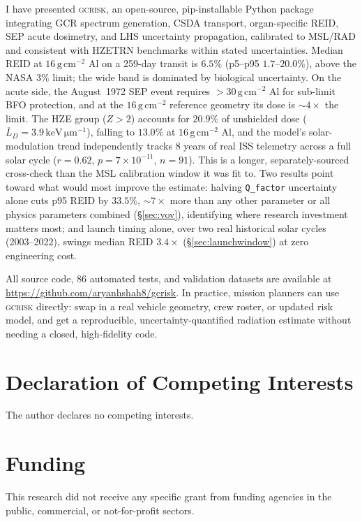 \documentclass[a4paper,fleqn]{cas-dc}
\newcommand{\gcm}{\,\mathrm{g\,cm^{-2}}}
\newcommand{\keVum}{\,\mathrm{keV\,\mu m^{-1}}}
\newcommand{\LETd}{\overline{L}_D}
\newcommand{\code}[1]{\texttt{#1}}
\begin{document}
I have presented \textsc{gcrisk}, an open-source,
pip-installable Python package integrating GCR spectrum generation, CSDA
transport, organ-specific REID, SEP acute dosimetry, and LHS uncertainty
propagation, calibrated to MSL/RAD and consistent with HZETRN benchmarks
within stated uncertainties. Median REID at $16\gcm$ Al on a 259-day
transit is $6.5\%$ (p5--p95 $1.7$--$20.0\%$), above the NASA $3\%$ limit;
the wide band is dominated by biological uncertainty. On the
acute side, the August~1972 SEP event requires $>30\gcm$ Al for sub-limit
BFO protection, and at the $16\gcm$ reference geometry its dose is
$\sim\!4\times$ the limit. The HZE group ($Z>2$) accounts for $20.9\%$ of
unshielded dose ($\LETd=3.9\keVum$), falling to $13.0\%$ at $16\gcm$ Al,
and the model's solar-modulation trend independently tracks 8 years of
real ISS telemetry across a full solar cycle ($r=0.62$, $p=7\times10^{-11}$,
$n=91$). This is a longer, separately-sourced cross-check than the MSL
calibration window it was fit to. Two results point toward what would
most improve the estimate: halving \code{Q\_factor} uncertainty alone cuts
p95 REID by $33.5\%$, $\sim\!7\times$ more than any other parameter or all
physics parameters combined (\S\ref{sec:vov}), identifying where research
investment matters most; and launch timing alone, over two real historical
solar cycles (2003--2022), swings median REID $3.4\times$
(\S\ref{sec:launchwindow}) at zero engineering cost.

All source code, 86 automated tests, and validation datasets are available
at \url{https://github.com/aryanhshah8/gcrisk}. In practice, mission
planners can use \textsc{gcrisk} directly: swap in a real vehicle
geometry, crew roster, or updated risk model, and get a reproducible,
uncertainty-quantified radiation estimate without needing a closed,
high-fidelity code.

\section*{Declaration of Competing Interests}

The author declares no competing interests.

\section*{Funding}

This research did not receive any specific grant from funding agencies in
the public, commercial, or not-for-profit sectors.
\end{document}
